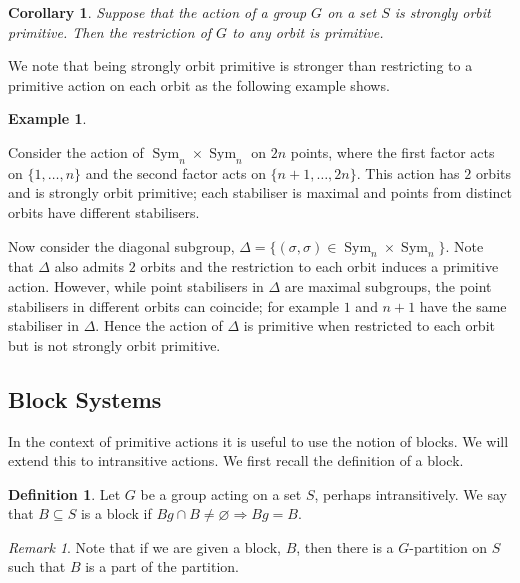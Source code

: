 \documentclass[11pt,a4paper]{amsart}
\renewcommand{\emptyset}{\varnothing}
\newtheorem{corollary}[theorem]{Corollary}
\theoremstyle{definition}
\newtheorem{example}[theorem]{Example}
\newtheorem{definition}[theorem]{Definition}
\theoremstyle{remark}
\newtheorem{remark}[theorem]{Remark}
\newcommand{\Sym}{\operatorname{Sym}}
\renewcommand{\implies}{\Rightarrow}
\begin{document}
\begin{corollary}
	Suppose that the action of a group $G$ on a set $S$ is strongly orbit primitive. Then the restriction of $G$ to any orbit is primitive. 
\end{corollary}

We note that being strongly orbit primitive is stronger than restricting to a primitive action on each orbit as the following example shows. 



\begin{example}
	\label{ex:not strongly orbit primitive}
	
	Consider the action of $\Sym_n \times \Sym_n$ on $2n$ points, where the first factor acts on $\{ 1, \ldots, n\}$ and the second factor acts on $\{n+1, \ldots, 2n\}$. This action has $2$ orbits and is strongly orbit primitive; each stabiliser is maximal and points from distinct orbits have different stabilisers.
	
	 
	 Now consider the diagonal subgroup, $\Delta = \{ (\sigma, \sigma) \in \Sym_n \times \Sym_n \}$. Note that $\Delta$ also admits $2$ orbits and the restriction to each orbit induces a primitive action. However, while point stabilisers in $\Delta$ are maximal subgroups, the point stabilisers in different orbits can coincide; for example $1$ and $n+1$ have the same stabiliser in $\Delta$. Hence the action of $\Delta$ is primitive when restricted to each orbit but is not strongly orbit primitive.
	\end{example}

\subsection*{Block Systems}

In the context of primitive actions it is useful to use the notion of blocks. We will extend this to intransitive actions. We first recall the definition of a block. 



\begin{definition}
	Let $G$ be a group acting on a set $S$, perhaps intransitively. We say that $B \subseteq S$ is a block if $Bg \cap B \neq \emptyset \implies Bg=B$.
\end{definition} 
\begin{remark}
	Note that if we are given a block, $B$, then there is a $G$-partition on $S$ such that $B$ is a part of the partition. 
\end{remark}
\end{document}
